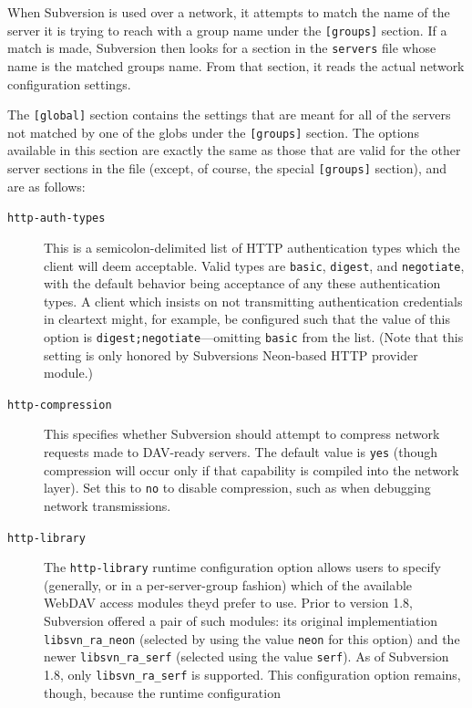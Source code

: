 When Subversion is used over a network, it attempts to match the name of
the server it is trying to reach with a group name under the
\texttt{{[}groups{]}} section. If a match is made, Subversion then looks
for a section in the \texttt{servers} file whose name is the matched
group\textquotesingle s name. From that section, it reads the actual
network configuration settings.

The \texttt{{[}global{]}} section contains the settings that are meant
for all of the servers not matched by one of the globs under the
\texttt{{[}groups{]}} section. The options available in this section are
exactly the same as those that are valid for the other server sections
in the file (except, of course, the special \texttt{{[}groups{]}}
section), and are as follows:

\begin{description}
\item[\texttt{http-auth-types}]
This is a semicolon-delimited list of HTTP authentication types which
the client will deem acceptable. Valid types are \texttt{basic},
\texttt{digest}, and \texttt{negotiate}, with the default behavior being
acceptance of any these authentication types. A client which insists on
not transmitting authentication credentials in cleartext might, for
example, be configured such that the value of this option is
\texttt{digest;negotiate}---omitting \texttt{basic} from the list. (Note
that this setting is only honored by Subversion\textquotesingle s
Neon-based HTTP provider module.)
\item[\texttt{http-compression}]
This specifies whether Subversion should attempt to compress network
requests made to DAV-ready servers. The default value is \texttt{yes}
(though compression will occur only if that capability is compiled into
the network layer). Set this to \texttt{no} to disable compression, such
as when debugging network transmissions.
\item[\texttt{http-library}]
The \texttt{http-library} runtime configuration option allows users to
specify (generally, or in a per-server-group fashion) which of the
available WebDAV access modules they\textquotesingle d prefer to use.
Prior to version 1.8, Subversion offered a pair of such modules: its
original implementiation \texttt{libsvn\_ra\_neon} (selected by using
the value \texttt{neon} for this option) and the newer
\texttt{libsvn\_ra\_serf} (selected using the value \texttt{serf}). As
of Subversion 1.8, only \texttt{libsvn\_ra\_serf} is supported. This
configuration option remains, though, because the runtime configuration

\end{description}
